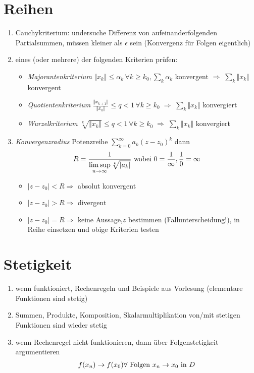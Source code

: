 \documentclass[ngerman,a4paper]{article}
\begin{document}
\section{Reihen}
\begin{enumerate}[label=\textbf{\arabic*.}]
	\item Cauchykriterium: undersuche Differenz von aufeinanderfolgenden Partialsummen, müssen kleiner als $\epsilon$ sein (Konvergenz für Folgen eigentlich)
	\item eines (oder mehrere) der folgenden Kriterien prüfen:
	\begin{itemize}
		\item \emph{Majorantenkriterium} $\Vert x_k\Vert \le \alpha_k\,\forall k\ge k_0,\sum_k \alpha_k$ konvergent $\Rightarrow\;\sum_k \Vert x_k\Vert$ konvergent
		\item \emph{Quotientenkriterium} $\frac{\Vert x_{k+1}\Vert}{\Vert x_k\Vert} \le q < 1\,\forall k\ge k_0 \;\Rightarrow\;\sum_k \Vert x_k\Vert$ konvergiert
		\item \emph{Wurzelkriterium} $\sqrt[k]{\Vert x_k\Vert}\le q < 1\,\forall k\ge k_0\;\Rightarrow\;\sum_k\Vert x_k\Vert$ konvergiert
	\end{itemize}
	\item \emph{Konvergenzradius} Potenzreihe $\sum_{k=0}^\infty a_k(z-z_0)^k$ dann
	\begin{align}
		R = \frac{1}{\limsup\limits_{n\rightarrow\infty}\sqrt[k]{|a_k|}}\text{ wobei }0 = \frac{1}{\infty}, \frac{1}{0} = \infty \notag
	\end{align}
	\begin{itemize}
		\item $\vert z-z_0\vert < R\Rightarrow$ absolut konvergent
		\item $\vert z-z_0\vert > R\Rightarrow$ divergent
		\item $\vert z-z_0\vert = R\Rightarrow$ keine Aussage,$z$ bestimmen (Fallunterscheidung!), in Reihe einsetzen und obige Kriterien testen
	\end{itemize}
\end{enumerate}

\section{Stetigkeit}
\begin{enumerate}[label=\textbf{\arabic*.}]
	\item wenn funktioniert, Rechenregeln und Beispiele aus Vorlesung (elementare Funktionen sind stetig)
	\item Summen, Produkte, Komposition, Skalarmultiplikation von/mit stetigen Funktionen sind wieder stetig
	\item wenn Rechenregel nicht funktionieren, dann über Folgenstetigkeit argumentieren
	\begin{align}
		f(x_n) \to f(x_0) \forall \text{ Folgen } x_n \to x_0 \text{ in } D\notag
	\end{align}
\end{enumerate}
\end{document}
